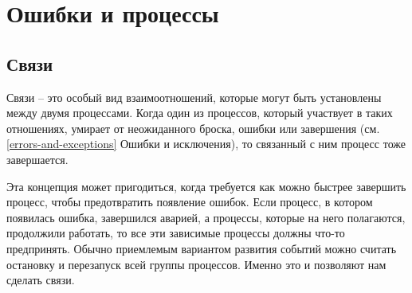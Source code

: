 \chapter{Ошибки и процессы}
\label{errors-and-processes}
\section{Связи}
\label{links}
Связи \--- это особый вид взаимоотношений, которые могут быть установлены между двумя процессами.
Когда один из процессов, который участвует в таких отношениях, умирает от неожиданного броска, ошибки или завершения (см. \ref{errors-and-exceptions} Ошибки и исключения), то связанный с ним процесс тоже завершается.

Эта концепция может пригодиться, когда требуется как можно быстрее завершить процесс, чтобы предотвратить появление ошибок.
Если процесс, в котором появилась ошибка, завершился аварией, а процессы, которые на него полагаются, продолжили работать, то все эти зависимые процессы должны что\--то предпринять.
Обычно приемлемым вариантом развития событий можно считать остановку и перезапуск всей группы процессов.
Именно это и позволяют нам сделать связи.
